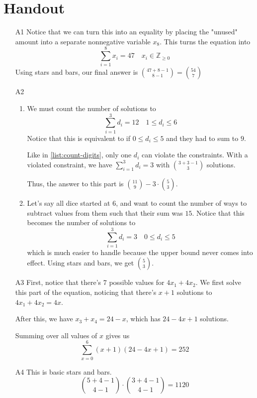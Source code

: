 \documentclass[12pt]{article}
\begin{document}
\section{Handout}\label{sec:handout}
\begin{itemize}
    \item[A1] Notice that we can turn this into an equality by placing the "unused" amount into a separate nonnegative variable $x_8$.
        This turns the equation into
        \[\sum_{i=1}^8 x_i=47 \quad x_i \in \mathbb{Z}_{\ge 0}\]
        Using stars and bars, our final answer is $\binom{47+8-1}{8-1}=\boxed{\binom{54}{7}}$
    \item[A2] \begin{enumerate}[label=\alph*]
            \item We must count the number of solutions to
                  \[\sum_{i=1}^3 d_i=12 \quad 1 \le d_i \le 6\]
                  Notice that this is equivalent to if $0 \le d_i \le 5$ and they had to sum to $9$.

                  Like in \ref*{list:count-digits}, only one $d_i$ can violate the constraints.
                  With a violated constraint, we have $\sum_{i=1}^{3} d_i=3$ with $\binom{3+3-1}{3}$ solutions.

                  Thus, the answer to this part is $\boxed{\binom{11}{9}-3 \cdot \binom{5}{3}}$.
            \item Let's say all dice started at $6$, and want to count the number of ways to subtract values from them such that their sum was $15$.
            Notice that this becomes the number of solutions to
            \[\sum_{i=1}^3 d_i=3 \quad 0 \le d_i \le 5\]
            which is much easier to handle because the upper bound never comes into effect.
            Using stars and bars, we get $\boxed{\binom{5}{3}}$.
        \end{enumerate}
    \item[A3] First, notice that there's $7$ possible values for $4x_1+4x_2$.
        We first solve this part of the equation, noticing that there's $x+1$ solutions to $4x_1+4x_2=4x$.

        After this, we have $x_3+x_4=24-x$, which has $24-4x+1$ solutions.

        Summing over all values of $x$ gives us
        \[\sum_{x=0}^6 (x+1)(24-4x+1)=\boxed{252}\]
    \item[A4] This is basic stars and bars.
        \[\binom{5+4-1}{4-1} \cdot \binom{3+4-1}{4-1}=\boxed{1120}\]
\end{itemize}
\end{document}
